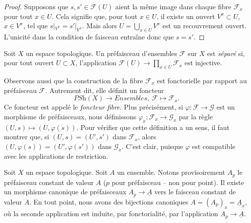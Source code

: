 \begin{proof}
Supposons que $s, s' \in \mathcal{F}(U)$ aient la même image
dans chaque fibre $\mathcal{F}_x$ pour tout $x \in U$. Cela signifie que,
pour tout $x \in U$, il existe un ouvert $V^x \subset U$,
$x \in V^x$, tel que $s|_{V^x} = s'|_{V^x}$. Mais alors
$U = \bigcup_{x \in U} V^x$ est un recouvrement ouvert. L'unicité
dans la condition de faisceau entraîne donc que $s = s'$.
\end{proof}

\begin{definition}
\label{definition-separated}
Soit $X$ un espace topologique.
Un préfaisceau d'ensembles $\mathcal{F}$ sur $X$ est {\it séparé}
si, pour tout ouvert $U \subset X$, l'application
$\mathcal{F}(U) \to \prod_{x \in U} \mathcal{F}_x$ est
injective.
\end{definition}

\noindent
Observons aussi que la construction de la fibre
$\mathcal{F}_x$ est fonctorielle par rapport au préfaisceau $\mathcal{F}$.
Autrement dit, elle définit un foncteur
$$
\textit{PSh}(X) \longrightarrow \textit{Ensembles},
\ \mathcal{F} \longmapsto \mathcal{F}_x.
$$
Ce foncteur est appelé le {\it foncteur fibre}.
Plus précisément, si $\varphi : \mathcal{F} \to \mathcal{G}$ est
un morphisme de préfaisceaux, nous définissons
$\varphi_x : \mathcal{F}_x \to \mathcal{G}_x$
par la règle $(U, s) \mapsto (U, \varphi(s))$.
Pour vérifier que cette définition a un sens, il faut montrer que,
si $(U, s) = (U', s')$ dans $\mathcal{F}_x$, alors
$(U, \varphi(s)) = (U', \varphi(s'))$ dans $\mathcal{G}_x$.
C'est clair, puisque $\varphi$ est compatible avec les
applications de restriction.

\begin{example}
\label{example-stalk-constant-presheaf}
Soit $X$ un espace topologique. Soit $A$ un ensemble.
Notons provisoirement $A_p$ le préfaisceau constant
de valeur $A$ ($p$ pour préfaisceau -- non pour point).
Il existe un morphisme canonique de préfaisceaux
$A_p \to \underline{A}$ vers le faisceau constant de
valeur $A$. En tout point, nous avons des
bijections canoniques $A = (A_p)_x = \underline{A}_x$, où
la seconde application est induite, par fonctorialité, par
l'application $A_p \to \underline{A}$.
\end{example}



